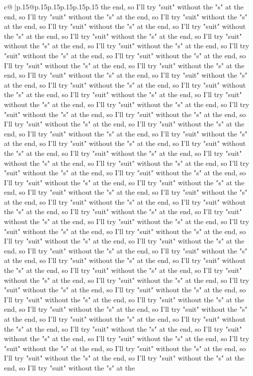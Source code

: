 \documentclass{article}
\begin{document}
{\begin{supertabular}{c@{$\;$}|p{.15\linewidth}@{}p{.15\linewidth}p{.15\linewidth}p{.15\linewidth}p{.15\linewidth}p{.15\linewidth}}
{{{the end, so I'll try "suit" without the "s" at the end, so I'll try "suit" without the "s" at the end, so I'll try "suit" without the "s" at the end, so I'll try "suit" without the "s" at the end, so I'll try "suit" without the "s" at the end, so I'll try "suit" without the "s" at the end, so I'll try "suit" without the "s" at the end, so I'll try "suit" without the "s" at the end, so I'll try "suit" without the "s" at the end, so I'll try "suit" without the "s" at the end, so I'll try "suit" without the "s" at the end, so I'll try "suit" without the "s" at the end, so I'll try "suit" without the "s" at the end, so I'll try "suit" without the "s" at the end, so I'll try "suit" without the "s" at the end, so I'll try "suit" without the "s" at the end, so I'll try "suit" without the "s" at the end, so I'll try "suit" without the "s" at the end, so I'll try "suit" without the "s" at the end, so I'll try "suit" without the "s" at the end, so I'll try "suit" without the "s" at the end, so I'll try "suit" without the "s" at the end, so I'll try "suit" without the "s" at the end, so I'll try "suit" without the "s" at the end, so I'll try "suit" without the "s" at the end, so I'll try "suit" without the "s" at the end, so I'll try "suit" without the "s" at the end, so I'll try "suit" without the "s" at the end, so I'll try "suit" without the "s" at the end, so I'll try "suit" without the "s" at the end, so I'll try "suit" without the "s" at the end, so I'll try "suit" without the "s" at the end, so I'll try "suit" without the "s" at the end, so I'll try "suit" without the "s" at the end, so I'll try "suit" without the "s" at the end, so I'll try "suit" without the "s" at the end, so I'll try "suit" without the "s" at the end, so I'll try "suit" without the "s" at the end, so I'll try "suit" without the "s" at the end, so I'll try "suit" without the "s" at the end, so I'll try "suit" without the "s" at the end, so I'll try "suit" without the "s" at the end, so I'll try "suit" without the "s" at the end, so I'll try "suit" without the "s" at the end, so I'll try "suit" without the "s" at the end, so I'll try "suit" without the "s" at the end, so I'll try "suit" without the "s" at the end, so I'll try "suit" without the "s" at the end, so I'll try "suit" without the "s" at the end, so I'll try "suit" without the "s" at the end, so I'll try "suit" without the "s" at the end, so I'll try "suit" without the "s" at the end, so I'll try "suit" without the "s" at the end, so I'll try "suit" without the "s" at the end, so I'll try "suit" without the "s" at the end, so I'll try "suit" without the "s" at the end, so I'll try "suit" without the "s" at the end, so I'll try "suit" without the "s" at the end, so I'll try "suit" without the "s" at the end, so I'll try "suit" without the "s" at the end, so I'll try "suit" without the "s" at the end, so I'll try "suit" without the "s" at the end, so I'll try "suit" without the "s" at the end, so I'll try "suit" without the "s" at the end, so I'll try "suit" without the "s" at the end, so I'll try "suit" without the "s" at the end, so I'll try "suit" without the "s" at the end, so I'll try "suit" without the "s" at the }}}
\end{supertabular}}
\end{document}
